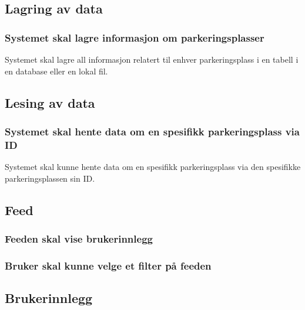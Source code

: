\documentclass[12pt]{article}
\begin{document}
    \subsection{Lagring av data}

    \subsubsection{Systemet skal lagre informasjon om parkeringsplasser}
    Systemet skal lagre all informasjon relatert til enhver parkeringsplass i en tabell i en database eller en lokal fil.

    \subsection{Lesing av data}

    \subsubsection{Systemet skal hente data om en spesifikk parkeringsplass via ID}
    Systemet skal kunne hente data om en spesifikk parkeringsplass via den spesifikke parkeringsplassen sin ID.

    \subsection{Feed}

    \subsubsection{Feeden skal vise brukerinnlegg}

    \subsubsection{Bruker skal kunne velge et filter på feeden}

    \subsection{Brukerinnlegg}
\end{document}
